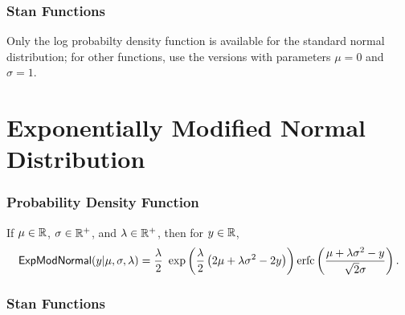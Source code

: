 \subsubsection{Stan Functions}

Only the log probabilty density function is available for the standard
normal distribution; for other functions, use the 
versions with parameters $\mu = 0$ and $\sigma = 1$.

\begin{description}
\end{description}



\section{Exponentially Modified Normal Distribution}

\subsubsection{Probability Density Function}

If $\mu \in \mathbb{R}$, $\sigma \in \mathbb{R}^+$, and $\lambda \in
\mathbb{R}^+$, then for $y \in \mathbb{R}$,
\[
\mbox{\sf ExpModNormal}(y|\mu,\sigma,\lambda)
=
\frac{\lambda}{2}
\
\exp \left(\frac{\lambda}{2} \left(2\mu + \lambda \sigma^2 - 2y\right)\right) \operatorname{erfc}\left(\frac{\mu + \lambda\sigma^2 - y}{\sqrt{2}\sigma}\right)
.
\]


\subsubsection{Stan Functions}

